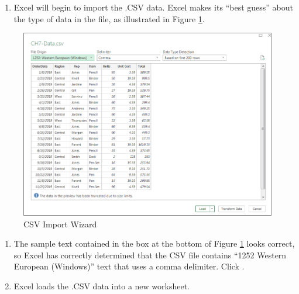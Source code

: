 \begin{enumerate}[resume]
	\item Excel will begin to import the .CSV data. Excel makes its ``best guess'' about the type of data in the file, as illustrated in Figure \ref{07:fig07a}.
\end{enumerate}

\begin{figure}[H]
	\centering
	\includegraphics[width=\maxwidth{.95\linewidth}]{gfx/ch07_fig07a}
	\caption{CSV Import Wizard}
	\label{07:fig07a}
\end{figure}

\begin{enumerate}
	\item The sample text contained in the box at the bottom of Figure \ref{07:fig07a} looks correct, so Excel has correctly determined that the CSV file contains ``1252 Western European (Windows)'' text that uses a comma delimiter. Click .
	\item Excel loads the .CSV data into a new worksheet.
\end{enumerate}

